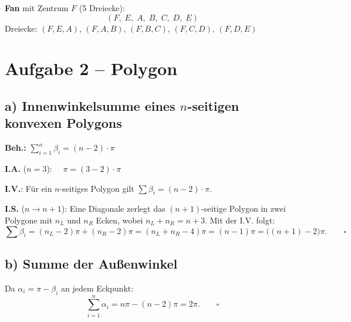\documentclass[11pt,a4paper]{article}
\begin{document}
\medskip
\noindent\textbf{Fan} mit Zentrum $F$ (5 Dreiecke):
\[
  (F,\; E,\; A,\; B,\; C,\; D,\; E)
\]
Dreiecke: $(F,E,A)$,\; $(F,A,B)$,\; $(F,B,C)$,\; $(F,C,D)$,\; $(F,D,E)$

\section{Aufgabe 2 -- Polygon}

\subsection*{a) Innenwinkelsumme eines $n$-seitigen konvexen Polygons}

\textbf{Beh.:} $\displaystyle\sum_{i=1}^{n} \beta_i = (n-2)\cdot\pi$

\medskip
\noindent\textbf{I.A.} ($n=3$): $\quad\pi = (3-2)\cdot\pi$ \checkmark

\medskip
\noindent\textbf{I.V.}: F\"ur ein $n$-seitiges Polygon gilt $\sum \beta_i = (n-2)\cdot\pi$.

\medskip
\noindent\textbf{I.S.} ($n \to n+1$): Eine Diagonale zerlegt das $(n{+}1)$-seitige
Polygon in zwei Polygone mit $n_L$ und $n_R$ Ecken, wobei $n_L + n_R = n + 3$.
Mit der I.V. folgt:
\[
  \sum \beta_i
  = (n_L - 2)\pi + (n_R - 2)\pi
  = (n_L + n_R - 4)\pi
  = (n - 1)\pi
  = \bigl((n+1)-2\bigr)\pi. \qquad\square
\]

\subsection*{b) Summe der Au\ss{}enwinkel}

Da $\alpha_i = \pi - \beta_i$ an jedem Eckpunkt:
\[
  \sum_{i=1}^{n} \alpha_i
  = n\pi - (n-2)\pi
  = 2\pi. \qquad\square
\]
\end{document}
